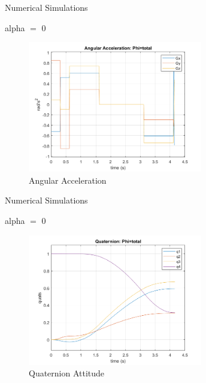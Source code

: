 \documentclass{beamer}
\begin{document}
\begin{frame}{Numerical Simulations}
	\begin{block}{alpha $=$ 0}
		
		
		\begin{figure}[H]
			\label{fig:ang_accel_total_alpha0}
			\begin{center}
				\includegraphics[width=3in]{figures/alpha0/ang_accel.png}
			\end{center}
			\caption{Angular Acceleration}
		\end{figure}
		
	\end{block}
\end{frame}
\begin{frame}{Numerical Simulations}
	\begin{block}{alpha $=$ 0}
		
		\begin{figure}[H]
			\label{fig:quats_phi_total_alpha0}
			\begin{center}
				\includegraphics[width=3in]{figures/alpha0/quats.png}
			\end{center}
			\caption{Quaternion Attitude}
		\end{figure}
		
	\end{block}
\end{frame}
\end{document}
